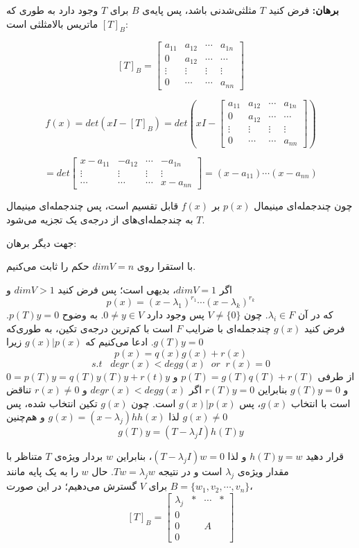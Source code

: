 \textbf{برهان:}
فرض کنید $T$ مثلثی‌شدنی باشد، پس پایه‌ی $B$ برای $T$ وجود دارد به طوری که $[T]_B$ ماتریس بالامثلثی است:

$$ [T]_B = \begin{bmatrix}
a_{11} & a_{12} & \cdots & a_{1n} \\
0 & a_{12} & \cdots & \cdots \\
\vdots & \vdots & \vdots & \vdots \\
0 & \cdots & \cdots & a_{nn}
\end{bmatrix}$$

$$ f(x)=det(xI-[T]_B) = det(xI-\begin{bmatrix}
a_{11} & a_{12} & \cdots & a_{1n} \\
0 & a_{12} & \cdots & \cdots \\
\vdots & \vdots & \vdots & \vdots \\
0 & \cdots & \cdots & a_{nn}
\end{bmatrix})$$

$$ = det \begin{bmatrix}
x-a_{11} & -a_{12} & \cdots & -a_{1n} \\
\vdots & \vdots & \vdots & \vdots \\
\cdots & \cdots & \cdots & x-a_{nn}
\end{bmatrix} = (x-a_{11})\cdots(x-a_{nn})$$

چون چندجمله‌ای مینیمال $p(x)$ بر $f(x)$ قابل تقسیم است، پس چندجمله‌ای مینیمال $T$ به چندجمله‌ای‌های از درجه‌ی یک تجزیه می‌شود.

جهت دیگر برهان:

با استقرا روی $dimV=n$ حکم را ثابت می‌کنیم.

اگر $dimV=1$، بدیهی است؛ پس فرض کنید $dimV>1$ و
$$p(x)=(x-\lambda_1)^{r_1}\cdots(x-\lambda_k)^{r_k}$$
که در آن
$\lambda_i \in F$.
چون
$V \neq \{0\}$
پس وجود دارد
$0 \neq y \in V$.
به وضوح $p(T)y=0$. فرض کنید $g(x)$ چندجمله‌ای با ضرایب $F$ است با کم‌ترین درجه‌ی تکین، به طوری‌که $g(T)y=0$. ادعا می‌کنیم که $g(x)|p(x)$ زیرا
$$p(x)=q(x)g(x)+r(x)$$
$$ s.t \; \; \; degr(x)<degg(x)  \; \; or \; \; r(x)=0$$
از طرفی
$p(T)=g(T)q(T)+r(T)$
و
$0=p(T)y=q(T)y(T)y+r(t)y$
و
$g(T)y=0$
بنابراین
$r(T)y=0$
اگر
$degr(x)<degg(x)$
و
$r(x)\neq 0$
تناقض است با انتخاب $g(x)$، پس  $g(x)|p(x)$ است.
چون
$g(x)$
تکین انتخاب شده، پس $g(x)\neq 0$ لذا
$g(x)=(x-\lambda_j)hh(x)$
و هم‌چنین
$$g(T)y=(T-\lambda_j I)h(T)y$$

قرار دهید
$h(T)y=w$
و لذا
$(T-\lambda_j I)w=0$،
بنابراین $w$ بردار ویژه‌ی $T$ متناظر با مقدار ویژه‌ی
$\lambda_j$
است و در نتیجه $Tw=\lambda_j w$. حال $w$ را به یک پایه مانند
$B=\{w_1,v_2,\cdots,v_n\}$
برای $V$ گسترش می‌دهیم؛ در این صورت،
$$[T]_B = \begin{bmatrix}
\lambda_j & * & \cdots & * \\
0 & \; & \; & \; \\
0 & \; & A & \; \\
0 & \; & \; & \;
\end{bmatrix}$$

